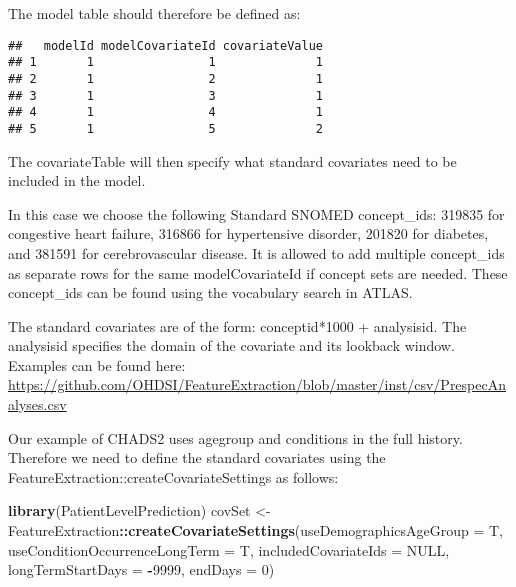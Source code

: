 \documentclass[]{article}
\newenvironment{Shaded}{\begin{snugshade}}{\end{snugshade}}
\newcommand{\KeywordTok}[1]{\textcolor[rgb]{0.13,0.29,0.53}{\textbf{#1}}}
\newcommand{\DataTypeTok}[1]{\textcolor[rgb]{0.13,0.29,0.53}{#1}}
\newcommand{\DecValTok}[1]{\textcolor[rgb]{0.00,0.00,0.81}{#1}}
\newcommand{\StringTok}[1]{\textcolor[rgb]{0.31,0.60,0.02}{#1}}
\newcommand{\OtherTok}[1]{\textcolor[rgb]{0.56,0.35,0.01}{#1}}
\newcommand{\OperatorTok}[1]{\textcolor[rgb]{0.81,0.36,0.00}{\textbf{#1}}}
\newcommand{\NormalTok}[1]{#1}
\begin{document}
The model table should therefore be defined as:

\begin{verbatim}
##   modelId modelCovariateId covariateValue
## 1       1                1              1
## 2       1                2              1
## 3       1                3              1
## 4       1                4              1
## 5       1                5              2
\end{verbatim}

The covariateTable will then specify what standard covariates need to be
included in the model.

In this case we choose the following Standard SNOMED concept\_ids:
319835 for congestive heart failure, 316866 for hypertensive disorder,
201820 for diabetes, and 381591 for cerebrovascular disease. It is
allowed to add multiple concept\_ids as separate rows for the same
modelCovariateId if concept sets are needed. These concept\_ids can be
found using the vocabulary search in ATLAS.

The standard covariates are of the form: conceptid*1000 + analysisid.
The analysisid specifies the domain of the covariate and its lookback
window. Examples can be found here:
\url{https://github.com/OHDSI/FeatureExtraction/blob/master/inst/csv/PrespecAnalyses.csv}

Our example of CHADS2 uses agegroup and conditions in the full history.
Therefore we need to define the standard covariates using the
FeatureExtraction::createCovariateSettings as follows:

\begin{Shaded}
\begin{Highlighting}[]
\KeywordTok{library}\NormalTok{(PatientLevelPrediction)}
\NormalTok{covSet <-}\StringTok{ }\NormalTok{FeatureExtraction}\OperatorTok{::}\KeywordTok{createCovariateSettings}\NormalTok{(}\DataTypeTok{useDemographicsAgeGroup =}\NormalTok{ T,                             }
                                                     \DataTypeTok{useConditionOccurrenceLongTerm =}\NormalTok{ T,}
                                                     \DataTypeTok{includedCovariateIds =} \OtherTok{NULL}\NormalTok{,}
                                                     \DataTypeTok{longTermStartDays =} \OperatorTok{-}\DecValTok{9999}\NormalTok{, }
                                                     \DataTypeTok{endDays =} \DecValTok{0}\NormalTok{)}
\end{Highlighting}
\end{Shaded}
\end{document}
